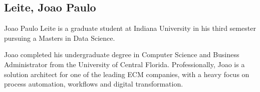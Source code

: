 \subsection{Leite, Joao Paulo}
Joao Paulo Leite is a graduate student at Indiana University in his third semester pursuing a Masters in Data Science.

Joao completed his undergraduate degree in Computer Science and Business Administrator from the University of Central Florida. 
Professionally, Joao is a solution architect for one of the leading ECM companies, with a heavy focus on process automation, 
workflows and digital transformation. 
